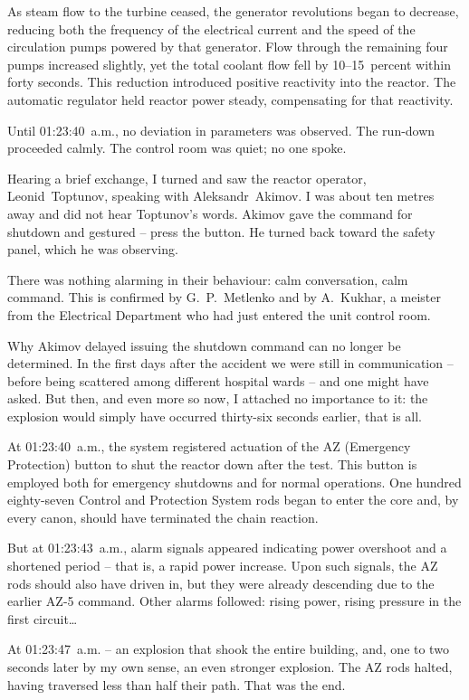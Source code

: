 \documentclass[openright]{bookest}
\begin{document}
As steam flow to the turbine ceased, the generator revolutions began to decrease, reducing both the frequency of the electrical current and the speed of the circulation pumps powered by that generator. Flow through the remaining four pumps increased slightly, yet the total coolant flow fell by \numrange{10}{15}~percent within forty seconds. This reduction introduced positive reactivity into the reactor. The automatic regulator held reactor power steady, compensating for that reactivity.

Until 01:23:40~a.m., no deviation in parameters was observed. The run-down proceeded calmly. The control room was quiet; no one spoke.

Hearing a brief exchange, I turned and saw the reactor operator, Leonid~Toptunov, speaking with Aleksandr~Akimov. I was about ten metres away and did not hear Toptunov's words. Akimov gave the command for shutdown and gestured -- press the button. He turned back toward the safety panel, which he was observing.

There was nothing alarming in their behaviour: calm conversation, calm command. This is confirmed by G.~P.~Metlenko and by A.~Kukhar, a meister from the Electrical Department who had just entered the unit control room.

Why Akimov delayed issuing the shutdown command can no longer be determined. In the first days after the accident we were still in communication -- before being scattered among different hospital wards -- and one might have asked. But then, and even more so now, I attached no importance to it: the explosion would simply have occurred thirty-six seconds earlier, that is all.

At 01:23:40~a.m., the system registered actuation of the AZ (Emergency Protection) button to shut the reactor down after the test. This button is employed both for emergency shutdowns and for normal operations. One hundred eighty-seven Control and Protection System rods began to enter the core and, by every canon, should have terminated the chain reaction.

But at 01:23:43~a.m., alarm signals appeared indicating power overshoot and a shortened period -- that is, a rapid power increase. Upon such signals, the AZ rods should also have driven in, but they were already descending due to the earlier AZ-5 command. Other alarms followed: rising power, rising pressure in the first circuit\ldots

At 01:23:47~a.m. -- an explosion that shook the entire building, and, one to two seconds later by my own sense, an even stronger explosion. The AZ rods halted, having traversed less than half their path. That was the end.
\end{document}

